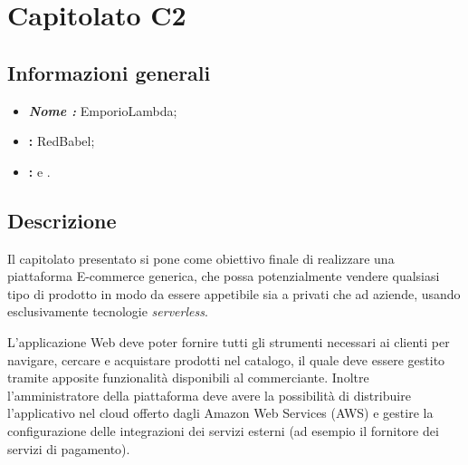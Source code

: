 \section{Capitolato C2}

\subsection{Informazioni generali}{
\begin{itemize}
\item \textbf{\emph{Nome :}} EmporioLambda;
\item \textbf{\commitProg:} RedBabel;
\item \textbf{\proponProg:} \VT{} e \CR.
\end{itemize}
}

\subsection{Descrizione}{
Il capitolato presentato si pone come obiettivo finale di realizzare una piattaforma E-commerce generica, che possa potenzialmente vendere qualsiasi tipo di prodotto in modo da essere appetibile sia a privati che ad aziende, usando esclusivamente tecnologie \textit{serverless}.

L'applicazione Web deve poter fornire tutti gli strumenti necessari ai clienti per navigare, cercare e acquistare prodotti nel catalogo, il quale deve essere gestito tramite apposite funzionalità disponibili al commerciante. Inoltre l'amministratore della piattaforma deve avere la possibilità di distribuire l'applicativo nel cloud offerto dagli Amazon Web Services (AWS) e gestire la configurazione delle integrazioni dei servizi esterni (ad esempio il fornitore dei servizi di pagamento).
}

